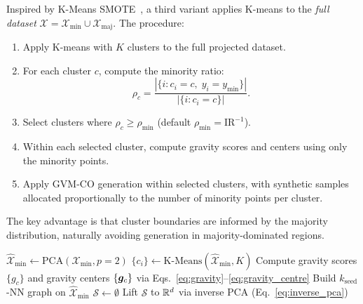 Inspired by K-Means SMOTE~\cite{douzas2018improving}, a third variant applies K-means to the \emph{full dataset} $\mathcal{X} = \mathcal{X}_{\min} \cup \mathcal{X}_{\text{maj}}$.
The procedure:
\begin{enumerate}[leftmargin=*]
    \item Apply K-means with $K$ clusters to the full projected dataset.
    \item For each cluster $c$, compute the minority ratio:
    \begin{equation}
        \rho_c = \frac{|\{i : c_i = c, \; y_i = y_{\min}\}|}{|\{i : c_i = c\}|}.
    \end{equation}
    \item Select clusters where $\rho_c \geq \rho_{\min}$ (default $\rho_{\min} = \text{IR}^{-1}$).
    \item Within each selected cluster, compute gravity scores and centers using only the minority points.
    \item Apply GVM-CO generation within selected clusters, with synthetic samples allocated proportionally to the number of minority points per cluster.
\end{enumerate}
The key advantage is that cluster boundaries are informed by the majority distribution, naturally avoiding generation in majority-dominated regions.

\begin{algorithm}[H]
\caption{GVM-CO: Gravity-biased Von Mises Circular Oversampling}
\label{alg:gvm_co}

$\hat{\mathcal{X}}_{\min} \leftarrow \mathrm{PCA}(\mathcal{X}_{\min}, p=2)$\;
$\{c_i\} \leftarrow \mathrm{K\text{-}Means}(\hat{\mathcal{X}}_{\min}, K)$\;
Compute gravity scores $\{g_c\}$ and gravity centers $\{\bm{g}_c\}$ via Eqs.~\eqref{eq:gravity}--\eqref{eq:gravity_centre}\;
Build $k_{\text{seed}}$-NN graph on $\hat{\mathcal{X}}_{\min}$\;
$\mathcal{S} \leftarrow \emptyset$\;
Lift $\mathcal{S}$ to $\mathbb{R}^d$ via inverse PCA (Eq.~\eqref{eq:inverse_pca})\;
\end{algorithm}


